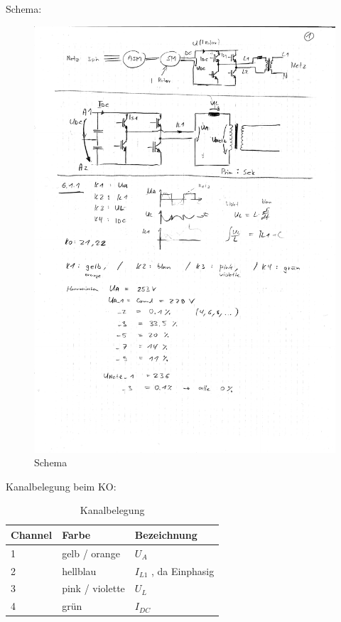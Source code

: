 
\noindent Schema:

\begin{figure}[H]
  \begin{center}
  \includegraphics[width=1\textwidth, trim={1cm 19.38cm 1cm 5cm},clip]{notes/scan1.pdf}
  \caption{Schema}
  \label{fig:schema}
  \end{center}
\end{figure}


Kanalbelegung beim KO:


\begin{table}[h]
  \centering
  \begin{tabular}{ l | l | l }
    \hline 
    Channel & Farbe & Bezeichnung \\
    \hline \hline
    1 & gelb / orange &  $U_A$ \\
    \hline
    2 & hellblau & $I_{L1}$ , da Einphasig\\  
    \hline 
    3 & pink / violette & $U_{L}$ \\  
    \hline
    4 & grün & $I_{DC}$ \\  
    \hline
  \end{tabular}
  \caption{Kanalbelegung}
  \label{tab:Kanalbelegung}
\end{table}




\clearpage